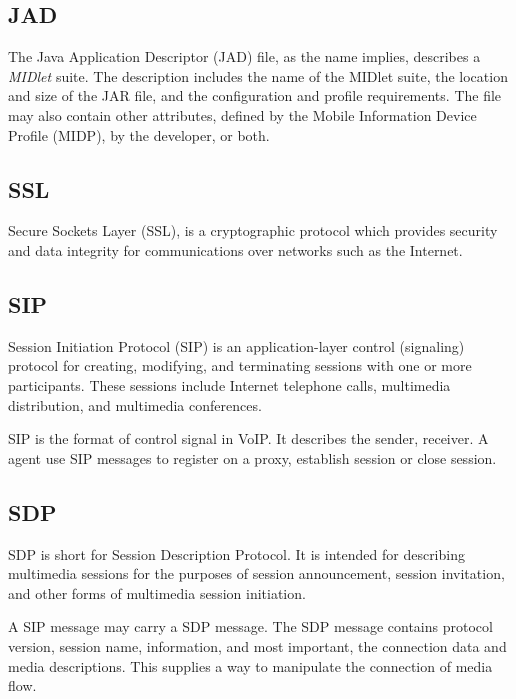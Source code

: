 \subsection*{JAD}
\label{sec:JAD}
\label{sym:JAD}

The Java Application Descriptor (JAD) file, as the name implies, describes a \textit{MIDlet} suite. The description includes the name of the MIDlet suite, the location and size of the JAR file, and the configuration and profile requirements. The file may also contain other attributes, defined by the Mobile Information Device Profile (MIDP), by the developer, or both.\cite{LearningPathMIDletLifeCycle}


\subsection*{SSL}
\label{sec:SSL}
\label{sym:SSL}

Secure Sockets Layer (SSL), is a cryptographic protocol which provides security and data integrity for communications over networks such as the Internet.\cite{SSL}


\subsection*{SIP}
\label{sec:SIP}
\label{sym:SIP}

Session Initiation Protocol (SIP) is an application-layer control (signaling) protocol for creating, modifying, and terminating sessions with one or more participants. These sessions include Internet telephone calls, multimedia distribution, and multimedia conferences.\cite{RFC3261}

SIP is the format of control signal in VoIP. It describes the sender, receiver. A agent use SIP messages to register on a proxy, establish session or close session. 

\subsection*{SDP}
\label{sec:SDP}
\label{sym:SDP}

SDP is short for Session Description Protocol. It is intended for describing multimedia sessions for the purposes of session announcement, session invitation, and other forms of multimedia session initiation.\cite{RFC4566}

A SIP message may carry a SDP message. The SDP message contains protocol version, session name, information, and most important, the connection data and media descriptions. This supplies a way to manipulate the connection of media flow. 

